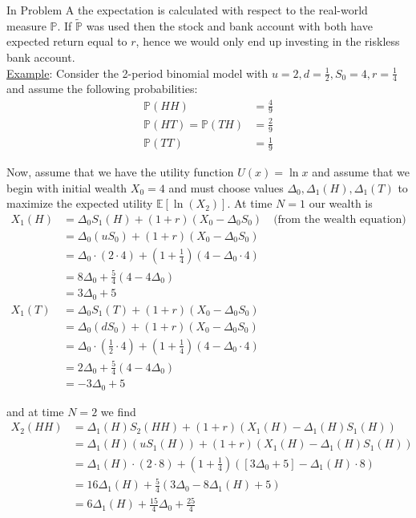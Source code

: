 \documentclass[12pt]{article}
\newlength\tindent
\renewcommand{\indent}{\hspace*{\tindent}}
\renewcommand{\P}{\mathbb P}
\newcommand{\E}{\mathbb E}
\begin{document}
\indent In Problem A the expectation is calculated with respect to the real-world measure $\P$. If $\tilde{\P}$ was used then the stock and bank account with both have expected return equal to $r$, hence we would only end up investing in the riskless bank account. \\

\underline{Example}: Consider the 2-period binomial model with $u = 2, d = \frac{1}{2}, S_0 = 4, r = \frac{1}{4}$ and assume the following probabilities:
\begin{align*}
	\P(HH) &= \frac{4}{9} \\
	\P(HT) = \P(TH) &= \frac{2}{9} \\
	\P(TT) &= \frac{1}{9}
\end{align*}

\indent Now, assume that we have the utility function $U(x) = \ln x$ and assume that we begin with initial wealth $X_0 = 4$ and must choose values $\Delta_0, \Delta_1(H), \Delta_1(T)$ to maximize the expected utility $\E[\ln(X_2)]$. At time $N = 1$ our wealth is
\begin{align*}
	X_1(H) &= \Delta_0S_1(H) + (1 + r)(X_0 - \Delta_0S_0) \quad \text{(from the wealth equation)} \\
	&= \Delta_0(uS_0) + (1 + r)(X_0 - \Delta_0S_0) \\
	&= \Delta_0 \cdot (2 \cdot 4) + \left(1 + \frac{1}{4} \right)(4 - \Delta_0 \cdot 4) \\
	&= 8\Delta_0 + \frac{5}{4}(4 - 4\Delta_0) \\
	&= 3\Delta_0 + 5 \\
	X_1(T) &= \Delta_0S_1(T) + (1 + r)(X_0 - \Delta_0S_0) \\
	&= \Delta_0(dS_0) + (1 + r)(X_0 - \Delta_0S_0) \\
	&= \Delta_0 \cdot \left(\frac{1}{2} \cdot 4\right) + \left(1 + \frac{1}{4}\right)(4 - \Delta_0 \cdot 4) \\
	&= 2\Delta_0 + \frac{5}{4}(4 - 4\Delta_0) \\
	&= -3\Delta_0 + 5
\end{align*}

and at time $N = 2$ we find
\begin{align*}
	X_2(HH) &= \Delta_1(H)S_2(HH) + (1 + r)(X_1(H) - \Delta_1(H)S_1(H)) \\
	&= \Delta_1(H)(uS_1(H)) + (1 + r)(X_1(H) - \Delta_1(H)S_1(H)) \\
	&= \Delta_1(H) \cdot (2 \cdot 8) + \left(1 + \frac{1}{4}\right)([3\Delta_0 + 5] - \Delta_1(H)\cdot 8) \\
	&= 16\Delta_1(H) + \frac{5}{4}(3\Delta_0 - 8\Delta_1(H) + 5) \\
	&= 6\Delta_1(H) + \frac{15}{4}\Delta_0 + \frac{25}{4}
\end{align*}
\end{document}
